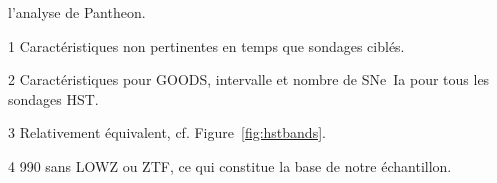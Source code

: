\documentclass[../main/main.tex]{subfiles}
\begin{document}
\begin{table}[ht]
\begin{threeparttable}
\begin{tablenotes}[flushleft]
            l'analyse de Pantheon.
        \item [1] Caractéristiques non pertinentes en temps que sondages ciblés.
        \item [2] Caractéristiques pour GOODS, intervalle et nombre de SNe~Ia
            pour tous les sondages HST.
        \item [3] Relativement équivalent, cf. Figure~\ref{fig:hstbands}.
        \item [4] 990 sans LOWZ ou ZTF, ce qui constitue la base de notre
            échantillon.
        \end{tablenotes}
    \end{threeparttable}
\end{table}
\shorthandon{:}
\vfill

\newpage

\thispagestyle{plain}
\vfill
\minilof
\vfill
\minilot
\vfill

% 
% 
\end{document}
